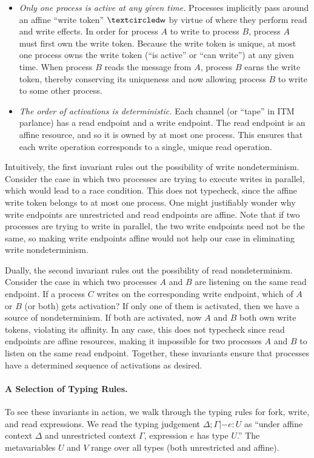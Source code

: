 \begin{itemize}[leftmargin=*]
\item \emph{Only one process is active at any given time.} Processes implicitly
  pass around an affine ``write token'' $\wrtok$ by virtue of where they perform
  read and write effects. In order for process $A$ to write to process $B$,
  process $A$ must first own the write token.  Because the write token is
  unique, at most one process owns the write token (``is active'' or ``can
  write'') at any given time. When process $B$ reads the message from $A$, process
  $B$ earns the write token, thereby conserving its uniqueness and now allowing
  process $B$ to write to some other process.
  
\item \emph{The order of activations is deterministic.} Each channel (or
  ``tape'' in ITM parlance) has a read endpoint and a write endpoint. The read
  endpoint is an affine resource, and so it is owned by at most one
  process. This ensures that each write operation corresponds to a single,
  unique read operation.
\end{itemize}

Intuitively, the first invariant rules out the possibility of write
nondeterminism. Consider the case in which two processes are trying to execute
writes in parallel, which would lead to a race condition. This does not
typecheck, since the affine write token belongs to at most one process. One
might justifiably wonder why write endpoints are unrestricted and read endpoints
are affine. Note that if two processes are trying to write in parallel, the two
write endpoints need not be the same, so making write endpoints affine would not
help our case in eliminating write nondeterminism.

Dually, the second invariant rules out the possibility of read
nondeterminism. Consider the case in which two processes $A$ and $B$ are
listening on the same read endpoint. If a process $C$ writes on the corresponding
write endpoint, which of $A$ or $B$ (or both) gets activation? If only one of
them is activated, then we have a source of nondeterminism. If both are
activated, now $A$ and $B$ both own write tokens, violating its affinity. In any
case, this does not typecheck since read endpoints are affine resources, making
it impossible for two processes $A$ and $B$ to listen on the same read
endpoint. Together, these invariants ensure that processes have a determined
sequence of activations as desired.

\paragraph{A Selection of Typing Rules.} To see these invariants in action, we walk through the typing rules for fork,
write, and read expressions. We read the typing judgement $\Delta ; \Gamma |- e : U$ as
``under affine context $\Delta$ and unrestricted context $\Gamma$, expression $e$ has
type $U$.'' The metavariables $U$ and $V$ range over all types (both
unrestricted and affine).

